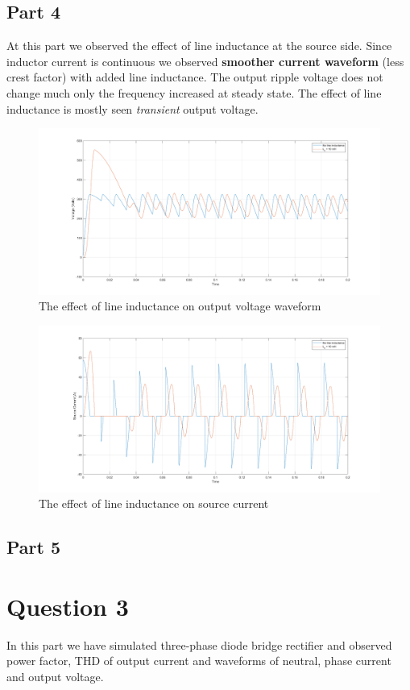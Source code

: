 \documentclass[fleqn, a4paper]{article}
\begin{document}
\subsection*{Part 4}
At this part we observed the effect of line inductance at the source side. Since inductor current is continuous we observed \textbf{smoother current waveform} (less crest factor) with added line inductance. The output ripple voltage does not change much only the frequency increased at steady state. The effect of line inductance is mostly seen \textit{transient} output voltage. 
\begin{figure}[H]
  \includegraphics[width=\linewidth]{part2d.png}
  \caption{The effect of line inductance on output voltage waveform}
  \label{fig:simulink3}
\end{figure}
\begin{figure}[H]
  \includegraphics[width=\linewidth]{part2d2.png}
  \caption{The effect of line inductance on source current}
  \label{fig:simulink3}
\end{figure}
\subsection*{Part 5}


\section*{Question 3}
In this part we have simulated three-phase diode bridge rectifier and observed power factor, THD of output current and waveforms of neutral, phase current and output voltage.
\end{document}
